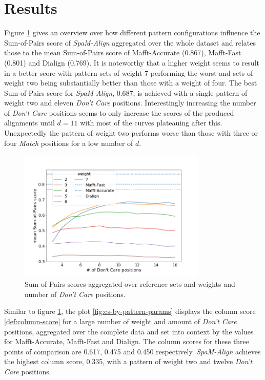 \section{Results}
Figure \ref{fig:sop-by-pattern-params} gives an overview over how different pattern configurations influence the Sum-of-Pairs score of \textit{SpaM-Align} aggregated over the whole \bb dataset and relates those to the mean Sum-of-Pairs score of Mafft-Accurate (0.867), Mafft-Fast (0.801) and Dialign (0.769). It is noteworthy that a higher weight seems to result in a better score with pattern sets of weight 7 performing the worst and sets of weight two being substantially better than those with a weight of four. The best Sum-of-Pairs score for \textit{SpaM-Align}, 0.687, is achieved with a single pattern of weight two and eleven \textit{Don't Care} positions. Interestingly increasing the number of \textit{Don't Care} positions seems to only increase the scores of the produced alignments until $d = 11$ with most of the curves plateauing after this. Unexpectedly the pattern of weight two performs worse than those with three or four \textit{Match} positions for a low number of $d$.
\begin{figure}[h]
	\centering
	\includegraphics[width=0.8\textwidth]{../alignment-evaluation/sop-by-pattern-params.png}
	\caption{Sum-of-Pairs scores aggregated over \bb reference sets and weights and number of \textit{Don't Care} positions.}
	\label{fig:sop-by-pattern-params}
\end{figure}

Similar to figure \ref{fig:sop-by-pattern-params}, the plot \ref{fig:cs-by-pattern-params} displays the column score \ref{def:column-score} for a large number of weight and amount of \textit{Don't Care} positions, aggregated over the complete \bb data and set into context by the values for Mafft-Accurate, Mafft-Fast and Dialign. The column scores for these three points of comparison are 0.617, 0.475 and 0.450 respectively. \textit{SpaM-Align} achieves the highest column score, 0.335, with a pattern of weight two and twelve \textit{Don't Care} positions.

